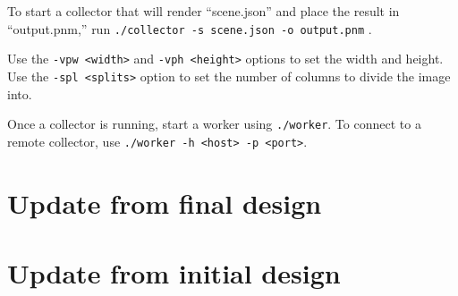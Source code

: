 \documentclass[letterpaper,twocolumn,10pt]{article}
\begin{document}
To start a collector that will render ``scene.json'' 
and place the result in ``output.pnm,'' run
\verb|./collector -s scene.json -o output.pnm|
.

Use the \verb|-vpw <width>| and \verb|-vph <height>| options to set the 
width and height. Use the \verb|-spl <splits>| option to set the number
of columns to divide the image into. 

Once a collector is running, start a worker using \verb|./worker|. 
To connect to a remote collector, use \verb|./worker -h <host> -p <port>|. 

\section{Update from final design}



\section{Update from initial design}


\end{document}
